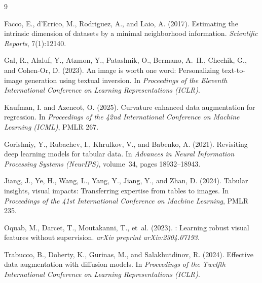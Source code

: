 \documentclass[10pt, a4paper]{article}
\begin{document}

\begin{thebibliography}{9}

Facco, E., d'Errico, M., Rodriguez, A., and Laio, A. (2017).
\newblock Estimating the intrinsic dimension of datasets by a minimal
  neighborhood information.
\newblock \emph{Scientific Reports}, 7(1):12140.

Gal, R., Alaluf, Y., Atzmon, Y., Patashnik, O., Bermano, A.~H., Chechik, G.,
and Cohen-Or, D. (2023).
\newblock An image is worth one word: Personalizing text-to-image generation
  using textual inversion.
\newblock In \emph{Proceedings of the Eleventh International Conference on
  Learning Representations (ICLR)}.

Kaufman, I. and Azencot, O. (2025).
\newblock Curvature enhanced data augmentation for regression.
\newblock In \emph{Proceedings of the 42nd International Conference on Machine
  Learning (ICML)}, PMLR 267.

Gorishniy, Y., Rubachev, I., Khrulkov, V., and Babenko, A. (2021).
\newblock Revisiting deep learning models for tabular data.
\newblock In \emph{Advances in Neural Information Processing Systems
  (NeurIPS)}, volume~34, pages 18932--18943.

Jiang, J., Ye, H., Wang, L., Yang, Y., Jiang, Y., and Zhan, D. (2024).
\newblock Tabular insights, visual impacts: Transferring expertise from tables
  to images.
\newblock In \emph{Proceedings of the 41st International Conference on Machine
  Learning}, PMLR 235.

Oquab, M., Darcet, T., Moutakanni, T., et~al. (2023).
: Learning robust visual features without supervision.
\newblock \emph{arXiv preprint arXiv:2304.07193}.

Trabucco, B., Doherty, K., Gurinas, M., and Salakhutdinov, R. (2024).
\newblock Effective data augmentation with diffusion models.
\newblock In \emph{Proceedings of the Twelfth International Conference on
  Learning Representations (ICLR)}.

\end{thebibliography}
\end{document}
